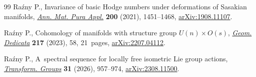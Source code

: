 \begin{thebibliography}{99}
Ra\'zny P., Invariance of basic {H}odge numbers under deformations of
 {S}asakian manifolds,
 \href{https://doi.org/10.1007/s10231-020-01044-8}{\textit{Ann. Mat. Pura
 Appl.}} \textbf{200} (2021), 1451--1468,
 \href{http://arxiv.org/abs/1908.11107}{arXiv:1908.11107}.

Ra\'zny P., Cohomology of manifolds with structure group {$U(n) \times O(s)$},
 \href{https://doi.org/10.1007/s10711-023-00796-w}{\textit{Geom. Dedicata}}
 \textbf{217} (2023), 58, 21~pages,
 \href{http://arxiv.org/abs/2207.04112}{arXiv:2207.04112}.

Ra\'zny P., A~spectral sequence for locally free isometric {L}ie group actions,
 \href{https://doi.org/10.1007/s00031-024-09855-2}{\textit{Transform. Groups}}
 \textbf{31} (2026), 957--974,
 \href{http://arxiv.org/abs/2308.11500}{arXiv:2308.11500}.

\end{thebibliography}
